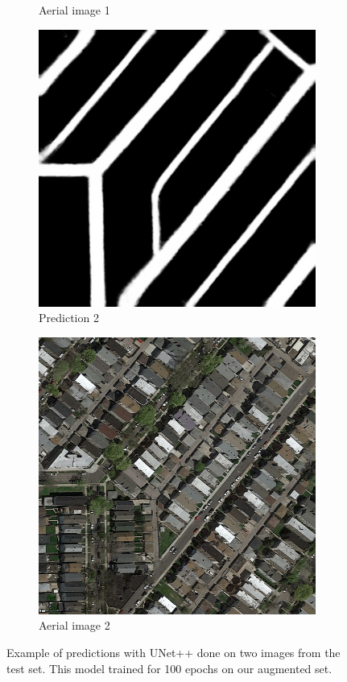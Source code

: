 \documentclass[10pt,conference,a4paper]{IEEEtran}
\begin{document}
\begin{figure}[ht]
\begin{subfigure}[b]{0.2\textwidth}
    \caption{Aerial image 1}
    \label{fig:aerial1}
  \end{subfigure}
  \begin{subfigure}[b]{0.2\textwidth}
    \includegraphics[width=\textwidth]{project2/report/images/gt_48.png}
    \caption{Prediction 2}
    \label{fig:gt2}
  \end{subfigure}
  \begin{subfigure}[b]{0.2\textwidth}
    \includegraphics[width=\textwidth]{project2/report/images/test_48.png}
    \caption{Aerial image 2}
    \label{fig:aerial2}
  \end{subfigure}
  \centering
  \caption{Example of predictions with UNet++ done on two images from the test set.
  This model trained for 100 epochs on our augmented set.}
  \centering
\end{figure}
\end{document}
